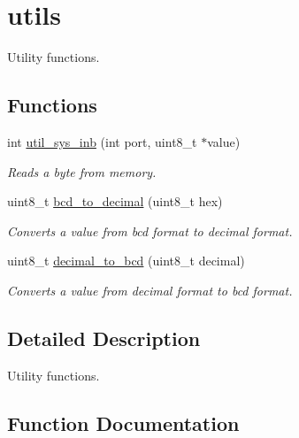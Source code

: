 \hypertarget{group__utils}{}\section{utils}
\label{group__utils}


Utility functions.  


\subsection*{Functions}
\begin{DoxyCompactItemize}
\item 
int \hyperlink{group__utils_ga2b56f50ba159e9d5115ed1a75eff15d9}{util\+\_\+sys\+\_\+inb} (int port, uint8\+\_\+t $\ast$value)
\begin{DoxyCompactList}\small\item\em Reads a byte from memory. \end{DoxyCompactList}\item 
uint8\+\_\+t \hyperlink{group__utils_ga304fc85c5c7fb06010deb07c6dd16b81}{bcd\+\_\+to\+\_\+decimal} (uint8\+\_\+t hex)
\begin{DoxyCompactList}\small\item\em Converts a value from bcd format to decimal format. \end{DoxyCompactList}\item 
uint8\+\_\+t \hyperlink{group__utils_ga8c10bb1f9a5bb82b67c6980182193c54}{decimal\+\_\+to\+\_\+bcd} (uint8\+\_\+t decimal)
\begin{DoxyCompactList}\small\item\em Converts a value from decimal format to bcd format. \end{DoxyCompactList}\end{DoxyCompactItemize}


\subsection{Detailed Description}
Utility functions. 



\subsection{Function Documentation}
\mbox{\label{group__utils_ga304fc85c5c7fb06010deb07c6dd16b81}} 
